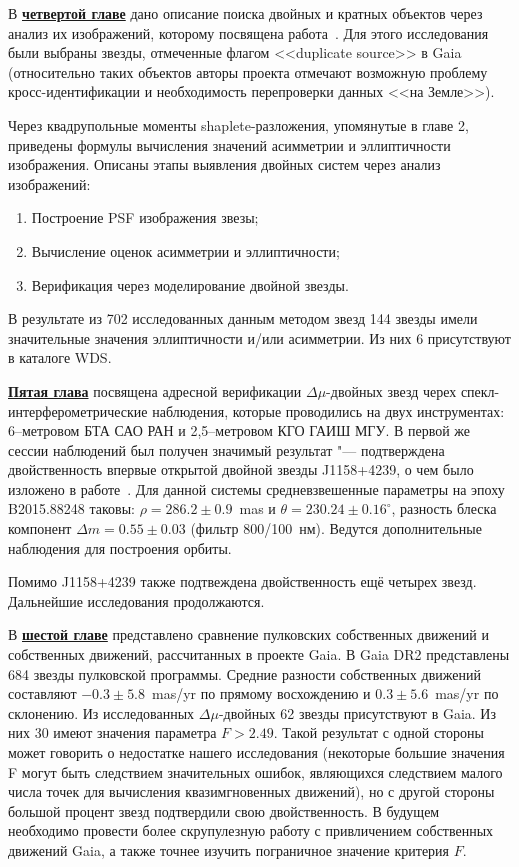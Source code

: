 В \underline{\textbf{четвертой главе}} дано описание поиска двойных и кратных объектов через анализ их изображений, которому посвящена работа~\cite{2018AstL...44..103K}. Для этого исследования были выбраны звезды, отмеченные флагом <<duplicate source>> в Gaia (относительно таких объектов авторы проекта отмечают возможную проблему кросс-идентификации и необходимость перепроверки данных <<на Земле>>).

Через квадрупольные моменты shaplete-разложения, упомянутые в главе 2, приведены формулы вычисления значений асимметрии и эллиптичности изображения. Описаны этапы выявления двойных систем через анализ изображений:
\begin{enumerate} 
  \item Построение PSF изображения звезы; 
  \item Вычисление оценок асимметрии и эллиптичности;
  \item Верификация через моделирование двойной звезды.
\end{enumerate}
В результате из 702 исследованных данным методом звезд 144 звезды имели значительные значения эллиптичности и/или асимметрии. Из них 6 присутствуют в каталоге WDS.

\underline{\textbf{Пятая глава}} посвящена адресной верификации $\Delta\mu$-двойных звезд черех спекл-интерферометрические наблюдения, которые проводились на двух инструментах: 6--метровом БТА САО РАН и 2,5--метровом КГО ГАИШ МГУ. В первой же сессии наблюдений был получен значимый результат "--- подтверждена двойственность впервые открытой двойной звезды J1158+4239, о чем было изложено в работе~\cite{2016AstL...42..686K}. Для данной системы средневзвешенные параметры на эпоху B2015.88248 таковы: $\rho = 286.2\pm0.9$~mas и $\theta=230.24\pm0.16^\circ$, разность блеска компонент $\Delta m = 0.55\pm0.03$ (фильтр 800/100~нм). Ведутся дополнительные наблюдения для построения орбиты.

Помимо J1158+4239 также подтвеждена двойственность ещё четырех звезд. Дальнейшие исследования продолжаются.

В \underline{\textbf{шестой главе}} представлено сравнение пулковских собственных движений и собственных движений, рассчитанных в проекте Gaia. В Gaia DR2 представлены 684 звезды пулковской программы. Средние разности собственных движений составляют $-0.3\pm5.8$~mas/yr по прямому восхождению и $0.3\pm5.6$~mas/yr по склонению. Из исследованных $\Delta\mu$-двойных 62 звезды присутствуют в Gaia.  Из них 30 имеют значения параметра $F>2.49$. Такой результат с одной стороны может говорить о недостатке нашего исследования (некоторые большие значения F могут быть следствием значительных ошибок, являющихся следствием малого числа точек для вычисления квазимгновенных движений), но с другой стороны большой процент звезд подтвердили свою двойственность. В будущем необходимо провести более скрупулезную работу с привличением собственных движений Gaia, а также точнее изучить пограничное значение критерия $F$. 

